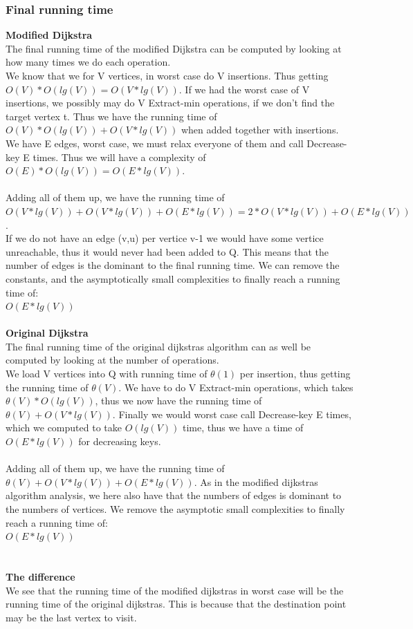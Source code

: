 \documentclass[11pt]{article}
\begin{document}
\subsubsection{Final running time}
\textbf{Modified Dijkstra}\\
The final running time of the modified Dijkstra can be computed by looking at how many times we do each operation.\\
We know that we for V vertices, in worst case do V insertions. Thus getting $O(V) * O(lg(V)) = O(V*lg(V))$. If we had the worst case of V insertions, we possibly may do V Extract-min operations, if we don't find the target vertex t. Thus we have the running time of $O(V) * O(lg(V)) + O(V*lg(V))$ when added together with insertions. We have E edges, worst case, we must relax everyone of them and call Decrease-key E times. Thus we will have a complexity of $O(E) * O(lg(V)) = O(E*lg(V))$.\\\\
Adding all of them up, we have the running time of $O(V*lg(V)) + O(V*lg(V)) + O(E*lg(V)) = 2*O(V*lg(V)) + O(E*lg(V))$.\\
If we do not have an edge (v,u) per vertice v-1 we would have some vertice unreachable, thus it would never had been added to Q. This means that the number of edges is the dominant to the final running time. We can remove the constants, and the asymptotically small complexities to finally reach a running time of:\\
$O(E*lg(V))$\\\\
\textbf{Original Dijkstra}\\
The final running time of the original dijkstras algorithm can as well be computed by looking at the number of operations.\\
We load V vertices into Q with running time of $\theta(1)$ per insertion, thus getting the running time of $\theta(V)$. We have to do V Extract-min operations, which takes $\theta(V) * O(lg(V))$, thus we now have the running time of $\theta(V) + O(V*lg(V))$. Finally we would worst case call Decrease-key E times, which we computed to take $O(lg(V))$ time, thus we have a time of $O(E*lg(V))$ for decreasing keys.\\\\
Adding all of them up, we have the running time of $\theta(V) + O(V*lg(V)) + O(E*lg(V))$. As in the modified dijkstras algorithm analysis, we here also have that the numbers of edges is dominant to the numbers of vertices. We remove the asymptotic small complexities to finally reach a running time of:\\
$O(E*lg(V))$\\\\\\
\textbf{The difference}\\
We see that the running time of the modified dijkstras in worst case will be the running time of the original dijkstras. This is because that the destination point may be the last vertex to visit.\\
\end{document}
